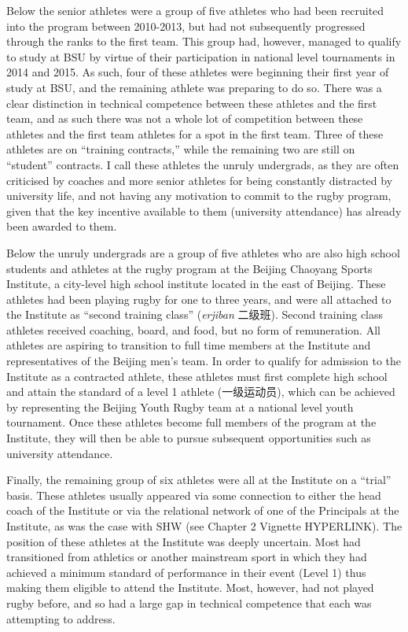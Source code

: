 \begin{CJK}{UTF8}{gbsn}


Below the senior athletes were a group of five athletes who had been recruited into the program between 2010-2013, but had not subsequently progressed through the ranks to the first team. This group had, however, managed to qualify to study at BSU by virtue of their participation in national level tournaments in 2014 and 2015. As such, four of these athletes were beginning their first year of study at BSU, and the remaining athlete was preparing to do so. There was a clear distinction in technical competence between these athletes and the first team, and as such there was not a whole lot of competition between these athletes and the first team athletes for a spot in the first team.  Three of these athletes are on ``training contracts,'' while the remaining two are still on ``student'' contracts.  I call these athletes the unruly undergrads, as they are often criticised by coaches and more senior athletes for being constantly distracted by university life, and not having any motivation to commit to the rugby program, given that the key incentive available to them (university attendance) has already been awarded to them.



Below the unruly undergrads are a group of five athletes who are also high school students and athletes at the rugby program at the Beijing Chaoyang Sports Institute, a city-level high school institute located in the east of Beijing.  These athletes had been playing rugby for one to three years, and were all attached to the Institute as ``second training class'' (\textit{erjiban} 二级班).  Second training class athletes received coaching, board, and food, but no form of remuneration.  All athletes are aspiring to transition to full time members at the Institute and representatives of the Beijing men's team.  In order to qualify for admission to the Institute as a contracted athlete, these athletes must first complete high school and attain the standard of a level 1 athlete (一级运动员), which can be achieved by representing the Beijing Youth Rugby team at a national level youth tournament.  Once these athletes become full members of the program at the Institute, they will then be able to pursue subsequent opportunities such as university attendance.

Finally, the remaining group of six athletes were all at the Institute on a ``trial'' basis.  These athletes usually appeared via some connection to either the head coach of the Institute or via the relational network of one of the Principals at the Institute, as was the case with SHW (see Chapter 2 Vignette HYPERLINK). The position of these athletes at the Institute was deeply uncertain.  Most had transitioned from athletics or another mainstream sport in which they had achieved a minimum standard of performance in their event (Level 1) thus making them eligible to attend the Institute.  Most, however, had not played rugby before, and so had a large gap in technical competence that each was attempting to address.



\end{CJK}
